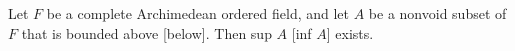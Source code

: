 Let $F$ be a complete Archimedean ordered field, and let $A$ be a nonvoid subset of $F$ that is bounded above [below]. Then sup $A$ [inf $A$] exists.